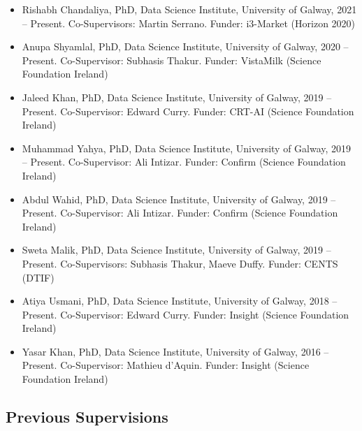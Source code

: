 \documentclass[10pt,a4paper]{res} %
\begin{document}
\begin{resume}
\begin{itemize} \itemsep -2pt
\item Rishabh Chandaliya, PhD, Data Science Institute, University of Galway, 2021 -- Present. Co-Supervisors: Martin Serrano. Funder: i3-Market (Horizon 2020)
\item Anupa Shyamlal, PhD, Data Science Institute, University of Galway, 2020 -- Present. Co-Supervisor: Subhasis Thakur. Funder: VistaMilk (Science Foundation Ireland)
\item Jaleed Khan, PhD, Data Science Institute, University of Galway, 2019 -- Present. Co-Supervisor: Edward Curry. Funder: CRT-AI (Science Foundation Ireland)
\item Muhammad Yahya, PhD, Data Science Institute, University of Galway, 2019 -- Present. Co-Supervisor: Ali Intizar. Funder: Confirm (Science Foundation Ireland)
\item Abdul Wahid, PhD, Data Science Institute, University of Galway, 2019 -- Present. Co-Supervisor: Ali Intizar. Funder: Confirm (Science Foundation Ireland)
\item Sweta Malik, PhD, Data Science Institute, University of Galway, 2019 -- Present. Co-Supervisors: Subhasis Thakur, Maeve Duffy. Funder: CENTS (DTIF)
\item Atiya Usmani, PhD, Data Science Institute, University of Galway, 2018 -- Present. Co-Supervisor: Edward Curry. Funder: Insight (Science Foundation Ireland)
\item Yasar Khan, PhD, Data Science Institute, University of Galway, 2016 -- Present. Co-Supervisor: Mathieu d'Aquin. Funder: Insight (Science Foundation Ireland)
\end{itemize}

\subsection*{Previous Supervisions}


\end{resume}
\end{document}
